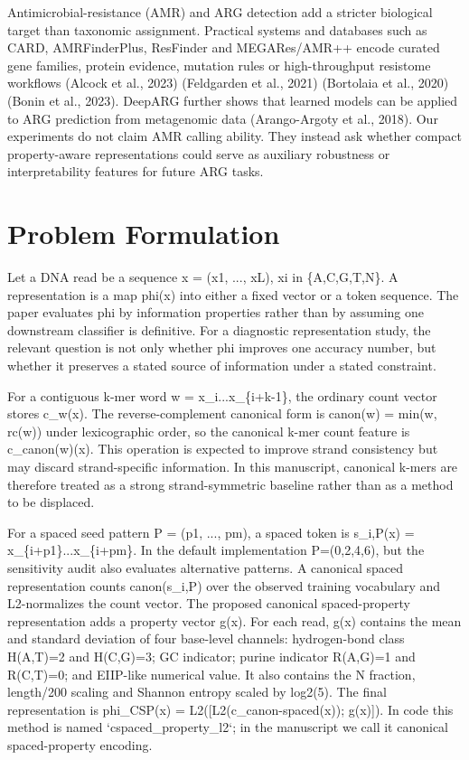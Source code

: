 \documentclass[11pt]{article}
\begin{document}
Antimicrobial-resistance (AMR) and ARG detection add a stricter biological target than taxonomic assignment. Practical systems and databases such as CARD, AMRFinderPlus, ResFinder and MEGARes/AMR++ encode curated gene families, protein evidence, mutation rules or high-throughput resistome workflows (Alcock et al., 2023) (Feldgarden et al., 2021) (Bortolaia et al., 2020) (Bonin et al., 2023). DeepARG further shows that learned models can be applied to ARG prediction from metagenomic data (Arango-Argoty et al., 2018). Our experiments do not claim AMR calling ability. They instead ask whether compact property-aware representations could serve as auxiliary robustness or interpretability features for future ARG tasks.


\section*{Problem Formulation}

Let a DNA read be a sequence x = (x1, ..., xL), xi in \{A,C,G,T,N\}. A representation is a map phi(x) into either a fixed vector or a token sequence. The paper evaluates phi by information properties rather than by assuming one downstream classifier is definitive. For a diagnostic representation study, the relevant question is not only whether phi improves one accuracy number, but whether it preserves a stated source of information under a stated constraint.


For a contiguous k-mer word w = x\_i...x\_\{i+k-1\}, the ordinary count vector stores c\_w(x). The reverse-complement canonical form is canon(w) = min(w, rc(w)) under lexicographic order, so the canonical k-mer count feature is c\_canon(w)(x). This operation is expected to improve strand consistency but may discard strand-specific information. In this manuscript, canonical k-mers are therefore treated as a strong strand-symmetric baseline rather than as a method to be displaced.


For a spaced seed pattern P = (p1, ..., pm), a spaced token is s\_i,P(x) = x\_\{i+p1\}...x\_\{i+pm\}. In the default implementation P=(0,2,4,6), but the sensitivity audit also evaluates alternative patterns. A canonical spaced representation counts canon(s\_i,P) over the observed training vocabulary and L2-normalizes the count vector. The proposed canonical spaced-property representation adds a property vector g(x). For each read, g(x) contains the mean and standard deviation of four base-level channels: hydrogen-bond class H(A,T)=2 and H(C,G)=3; GC indicator; purine indicator R(A,G)=1 and R(C,T)=0; and EIIP-like numerical value. It also contains the N fraction, length/200 scaling and Shannon entropy scaled by log2(5). The final representation is phi\_CSP(x) = L2([L2(c\_canon-spaced(x)); g(x)]). In code this method is named `cspaced\_property\_l2`; in the manuscript we call it canonical spaced-property encoding.
\end{document}
